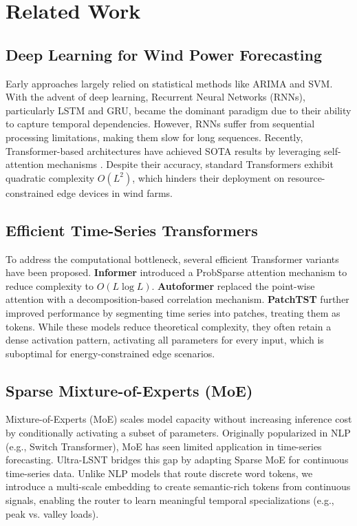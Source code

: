 \documentclass[a4paper,fleqn]{cas-sc}
\begin{document}
\section{Related Work}

\subsection{Deep Learning for Wind Power Forecasting}
Early approaches largely relied on statistical methods like ARIMA and SVM. With the advent of deep learning, Recurrent Neural Networks (RNNs), particularly LSTM \cite{lstm1997} and GRU, became the dominant paradigm due to their ability to capture temporal dependencies. However, RNNs suffer from sequential processing limitations, making them slow for long sequences. Recently, Transformer-based architectures have achieved SOTA results by leveraging self-attention mechanisms \cite{transformer2017}. Despite their accuracy, standard Transformers exhibit quadratic complexity $O(L^2)$, which hinders their deployment on resource-constrained edge devices in wind farms.

\subsection{Efficient Time-Series Transformers}
To address the computational bottleneck, several efficient Transformer variants have been proposed. \textbf{Informer} \cite{informer2021} introduced a ProbSparse attention mechanism to reduce complexity to $O(L \log L)$. \textbf{Autoformer} \cite{autoformer2021} replaced the point-wise attention with a decomposition-based correlation mechanism. \textbf{PatchTST} \cite{patchtst2023} further improved performance by segmenting time series into patches, treating them as tokens. While these models reduce theoretical complexity, they often retain a dense activation pattern, activating all parameters for every input, which is suboptimal for energy-constrained edge scenarios.

\subsection{Sparse Mixture-of-Experts (MoE)}
Mixture-of-Experts (MoE) scales model capacity without increasing inference cost by conditionally activating a subset of parameters. Originally popularized in NLP (e.g., Switch Transformer), MoE has seen limited application in time-series forecasting. Ultra-LSNT bridges this gap by adapting Sparse MoE \cite{moe2017} for continuous time-series data. Unlike NLP models that route discrete word tokens, we introduce a multi-scale embedding to create semantic-rich tokens from continuous signals, enabling the router to learn meaningful temporal specializations (e.g., peak vs. valley loads).
\end{document}

